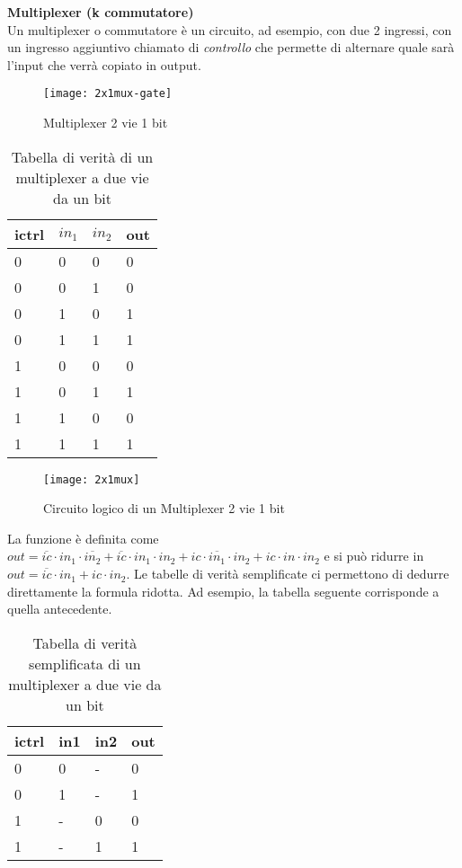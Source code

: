 \begin{defn}
	\textbf{Multiplexer (k commutatore)} \\
	Un multiplexer o commutatore è un circuito, ad esempio, con due 2 ingressi,
	con un ingresso aggiuntivo chiamato di \textit{controllo} che permette di
	alternare quale sarà l'input che verrà copiato in output.
	
	\begin{figure}[H]
		\centering
		\texttt{[image: 2x1mux-gate]}
		\caption{Multiplexer 2 vie 1 bit}
	\end{figure}
	
	\begin{table}[H]
		\centering
		\caption{Tabella di verità di un multiplexer a due vie da un bit}
		\label{tab:multiplexer1}
		\begin{tabular}{|lll|l|}
			\hline
			ictrl & $ in_1 $ & $ in_2 $ & out \\ \hline
			0     & 0   & 0   & 0   \\
			0     & 0   & 1   & 0   \\
			0     & 1   & 0   & 1   \\
			0     & 1   & 1   & 1   \\ \hline
			1     & 0   & 0   & 0   \\
			1     & 0   & 1   & 1   \\
			1     & 1   & 0   & 0   \\
			1     & 1   & 1   & 1   \\ \hline
		\end{tabular}
	\end{table}
	
	\begin{figure}[H]
		\centering
		\texttt{[image: 2x1mux]}
		\caption{Circuito logico di un Multiplexer 2 vie 1 bit}
	\end{figure}
	
	
	
	La funzione è definita come $ out = \overbar{ic} \cdot in_1 \cdot
	\overbar{in_2} + \overbar{ic} \cdot in_1 \cdot in_2 + ic \cdot
	\overbar{in_1} \cdot in_2 + ic \cdot in \cdot in_2 $ e si può ridurre in $
	out = \overbar{ic} \cdot in_1 + ic \cdot in_2 $. Le tabelle di verità
	semplificate ci permettono di dedurre direttamente la formula ridotta. Ad
	esempio, la tabella seguente corrisponde a quella antecedente.
	\begin{table}[H]
		\centering
		\caption{Tabella di verità semplificata di un multiplexer a due vie da un bit}
		\label{tab:multiplexer2}
		\begin{tabular}{|lll|l|}
			\hline
			ictrl & in1 & in2 & out \\ \hline
			0     & 0   & -   & 0   \\
			0     & 1   & -   & 1   \\ \hline
			1     & -   & 0   & 0   \\
			1     & -   & 1   & 1   \\ \hline
		\end{tabular}
	\end{table}
\end{defn}

